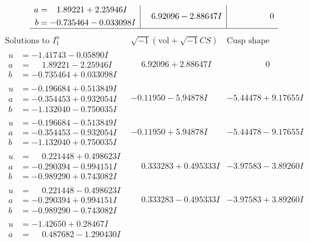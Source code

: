 \documentclass[1p]{elsarticle_modified}
\theoremstyle{definition}
\newcommand{\I}{\sqrt{-1}}
\begin{document}
$$\begin{array}{c|c|c}
\begin{aligned}
a &= \phantom{-}1.89221 + 2.25946 I \\
b &= -0.735464 - 0.033098 I\end{aligned}
 & \phantom{-}6.92096 - 2.88647 I & \phantom{-0.000000 } 0\\
 \hline 
 \end{array}$$\newpage$$\begin{array}{c|c|c}  
\text{Solutions to }I^u_{1}& \I (\text{vol} + \sqrt{-1}CS) & \text{Cusp shape}\\
 \hline 
\begin{aligned}
u &= -1.41743 - 0.05890 I \\
a &= \phantom{-}1.89221 - 2.25946 I \\
b &= -0.735464 + 0.033098 I\end{aligned}
 & \phantom{-}6.92096 + 2.88647 I & \phantom{-0.000000 } 0 \\ \hline\begin{aligned}
u &= -0.196684 + 0.513849 I \\
a &= -0.354453 + 0.932054 I \\
b &= -1.132040 - 0.750035 I\end{aligned}
 & -0.11950 - 5.94878 I & -5.44478 + 9.17655 I \\ \hline\begin{aligned}
u &= -0.196684 - 0.513849 I \\
a &= -0.354453 - 0.932054 I \\
b &= -1.132040 + 0.750035 I\end{aligned}
 & -0.11950 + 5.94878 I & -5.44478 - 9.17655 I \\ \hline\begin{aligned}
u &= \phantom{-}0.221448 + 0.498623 I \\
a &= -0.290394 - 0.994151 I \\
b &= -0.989290 + 0.743082 I\end{aligned}
 & \phantom{-}0.333283 + 0.495333 I & -3.97583 - 3.89260 I \\ \hline\begin{aligned}
u &= \phantom{-}0.221448 - 0.498623 I \\
a &= -0.290394 + 0.994151 I \\
b &= -0.989290 - 0.743082 I\end{aligned}
 & \phantom{-}0.333283 - 0.495333 I & -3.97583 + 3.89260 I \\ \hline\begin{aligned}
u &= -1.42650 + 0.28467 I \\
a &= \phantom{-}0.487682 - 1.290430 I \\

\end{aligned}
\end{array}$$
\end{document}
